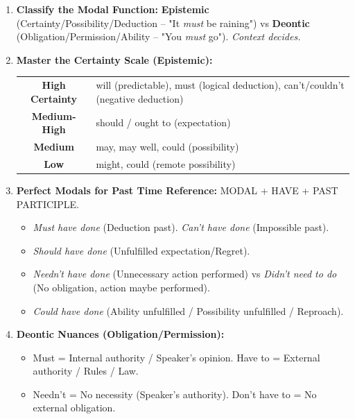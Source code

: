 \documentclass[11pt]{article}
\newcommand{\cle}[1]{{\popxbold\color{popdark}#1}}
\begin{document}
\begin{methode}
\begin{enumerate}
    \item \textbf{Classify the \cle{Modal Function}:} \textbf{Epistemic} (Certainty/Possibility/Deduction -- "It \emph{must} be raining") vs \textbf{Deontic} (Obligation/Permission/Ability -- "You \emph{must} go"). \emph{Context decides.}
    \item \textbf{Master the \cle{Certainty Scale} (Epistemic):}
    \begin{center}
    \begin{tabular}{c|l}
    \hline
    \textbf{High Certainty} & \cle{will} (predictable), \cle{must} (logical deduction), \cle{can't/couldn't} (negative deduction) \\
    \textbf{Medium-High} & \cle{should / ought to} (expectation) \\
    \textbf{Medium} & \cle{may}, \cle{may well}, \cle{could} (possibility) \\
    \textbf{Low} & \cle{might}, \cle{could} (remote possibility) \\
    \hline
    \end{tabular}
    \end{center}
    \item \textbf{Perfect Modals for Past Time Reference:} \cle{MODAL + HAVE + PAST PARTICIPLE}.
    \begin{itemize}
        \item \textit{Must have done} (Deduction past). \textit{Can't have done} (Impossible past).
        \item \textit{Should have done} (Unfulfilled expectation/Regret).
        \item \textit{Needn't have done} (Unnecessary action performed) vs \textit{Didn't need to do} (No obligation, action maybe performed).
        \item \textit{Could have done} (Ability unfulfilled / Possibility unfulfilled / Reproach).
    \end{itemize}
    \item \textbf{Deontic Nuances (Obligation/Permission):}
    \begin{itemize}
        \item \cle{Must} = Internal authority / Speaker's opinion. \cle{Have to} = External authority / Rules / Law.
        \item \cle{Needn't} = No necessity (Speaker's authority). \cle{Don't have to} = No external obligation.

\end{itemize}
\end{enumerate}
\end{methode}
\end{document}
